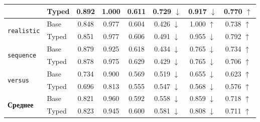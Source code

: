 \begin{table}[H]
\begin{tabular}{llccc|ccc}
                                            & Typed                              & 0.892                                               & 1.000                                              & 0.611       & 0.729 $\downarrow$ & 0.917 $\downarrow$ & 0.770 $\uparrow$ \\
        \hline
        \multirow{2}{*}{\texttt{realistic}} & Base                               & 0.848                                               & 0.977                                              & 0.604       & 0.426 $\downarrow$ & 1.000 $\uparrow$   & 0.738 $\uparrow$ \\
                                            & Typed                              & 0.851                                               & 0.977                                              & 0.606       & 0.491 $\downarrow$ & 0.955 $\downarrow$ & 0.792 $\uparrow$ \\
        \hline
        \multirow{2}{*}{\texttt{sequence}}  & Base                               & 0.879                                               & 0.925                                              & 0.618       & 0.434 $\downarrow$ & 0.765 $\downarrow$ & 0.734 $\uparrow$ \\
                                            & Typed                              & 0.878                                               & 0.975                                              & 0.629       & 0.429 $\downarrow$ & 0.765 $\downarrow$ & 0.706 $\uparrow$ \\
        \hline
        \multirow{2}{*}{\texttt{versus}}    & Base                               & 0.734                                               & 0.900                                              & 0.569       & 0.519 $\downarrow$ & 0.655 $\downarrow$ & 0.623 $\uparrow$ \\
                                            & Typed                              & 0.696                                               & 0.813                                              & 0.555       & 0.547 $\downarrow$ & 0.568 $\downarrow$ & 0.576 $\uparrow$ \\
        \hline
        \multirow{2}{*}{\textbf{Среднее}}   & Base                               & 0.821                                               & 0.960                                              & 0.592       & 0.558 $\downarrow$ & 0.859 $\downarrow$ & 0.718 $\uparrow$ \\
                                            & Typed                              & 0.823                                               & 0.945                                              & 0.600       & 0.581 $\downarrow$ & 0.808 $\downarrow$ & 0.711 $\uparrow$ \\
        \hline
    \end{tabular}
\end{table}

